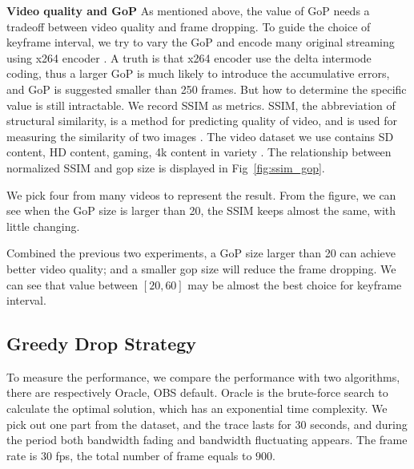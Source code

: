 \textbf{Video quality and GoP} As mentioned above, the value of GoP needs a tradeoff between video quality and frame dropping. To guide the choice of keyframe interval, we try to vary the GoP and encode many original streaming using x264 encoder \cite{x264}. A truth is that x264 encoder use the delta intermode coding, thus a larger GoP is much likely to introduce the accumulative errors, and GoP is suggested smaller than 250 frames. But how to determine the specific value is still intractable. We record SSIM as metrics. SSIM, the abbreviation of structural similarity, is a method for predicting quality of video, and is used for measuring the similarity of two images \cite{wang2004image}. The video dataset we use contains SD content, HD content, gaming, 4k content in variety \cite{video_dataset}. The relationship between normalized SSIM and gop size is displayed in Fig~\ref{fig:ssim_gop}.

We pick four from many videos to represent the result. From the figure, we can see when the GoP size is larger than 20, the SSIM keeps almost the same, with little changing.

Combined the previous two experiments, a GoP size larger than 20 can achieve better video quality; and a smaller gop size will reduce the frame dropping. We can see that value between $[20,60]$ may be almost the best choice for keyframe interval.

\iffalse

\textbf{Varying bitrate.}
To make the conclusion more visible, we fix key frame interval to be 8s and introduce network interruption between 19s and 21s. In different experiments, we provide sufficient network bandwidth and vary the bitrate to be 1000kbps, 1500kbps, 2000kbps, and 2500kbps. The frame drop is shown in Table~\ref{tab:bitrate}. The different bitrates do not make much difference, the number of drop in all cases is about 149.

\textbf{Summary.} We summarize and get conclusions. First, reducing keyframe interval leads to less frame drop. Second, bitrate does not influence frame drop for the short-term case, but the quality of each picture. Preliminary Evaluation points out that a small GoP is one useful try.
\fi

\subsection{Greedy Drop Strategy}
To measure the performance, we compare the performance with two algorithms, there are respectively Oracle, OBS default. Oracle is the brute-force search to calculate the optimal solution, which has an exponential time complexity. We pick out one part from the dataset, and the trace lasts for $30$ seconds, and during the period both bandwidth fading and bandwidth fluctuating appears. The frame rate is $30$ fps, the total number of frame equals to $900$.

